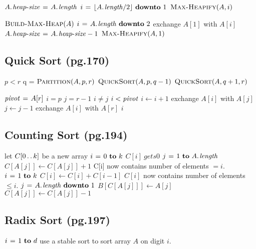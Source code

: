 \documentclass[twocolumn]{article}
\begin{document}
\begin{codebox}
\li $\attrib{A}{heap-size} \gets \attrib{A}{length}$
\li \For $i \gets \lfloor\attrib{A}{length}/2\rfloor \Downto 1$
\li \Do $\textnormal{\scshape Max-Heapify}(A,i)$
	\End
\end{codebox}

\begin{codebox}
\li $\textnormal{\scshape Build-Max-Heap}(A)$
\li \For $i \gets \attrib{A}{length} \Downto 2$
\li \Do exchange $A[1]$ with $A[i]$
\li 		$\attrib{A}{heap-size} \gets \attrib{A}{heap-size} - 1$
\li 		$\textnormal{\scshape Max-Heapify}(A,1)$
	\End
\end{codebox}

\subsection{Quick Sort (pg.170)}
\begin{codebox}
\li \If $p < r$
\li \Do q = $\textnormal{\scshape Partition}(A,p,r)$
\li 		$\textnormal{\scshape QuickSort}(A,p,q-1)$
\li 		$\textnormal{\scshape QuickSort}(A,q+1,r)$
	\End
\end{codebox}

\begin{codebox}
\li $\id{pivot} \gets A[r]$
\li $i = p$
\li $j = r-1$
\li \While $i \neq j$
\li \Do \If $i < \id{pivot}$
\li 		\Then $i \gets i+1$
\li 		\Else exchange $A[i]$ with $A[j]$
\li 			  $j \gets j-1$
		\End
	\End
\li exchange $A[i]$ with $A[r]$
\li \Return $i$
\end{codebox}

\subsection{Counting Sort (pg.194)}
\begin{codebox}
\li let $C[0 \mathinner{\ldotp\ldotp} k]$ be a new array
\li \For $i \gets 0 \To k$
\li \Do $C[i] \ gets 0$
	\End
\li \For $j \gets 1 \To \attrib{A}{length}$
\li \Do $C[A[j]] \gets C[A[j]] + 1$
	\End
\li \Comment C[i] now contains number of elements $= i$.
\li \For $i \gets 1 \To k$
\li \Do $C[i] \gets C[i] + C[i-1]$
	\End
\li \Comment $C[i]$ now contains number of elements $\le i$.
\li \For $j \gets \attrib{A}{length} \Downto 1$
\li \Do $B[C[A[j]]] \gets A[j]$
\li 		$C[A[j]] \gets C[A[j]] - 1$
	\End
\end{codebox}

\subsection{Radix Sort (pg.197)}
\begin{codebox}
\li \For $i \gets 1 \To d$
\li \Do use a stable sort to sort array $A$ on digit $i$.
	\End
\end{codebox}
\end{document}

